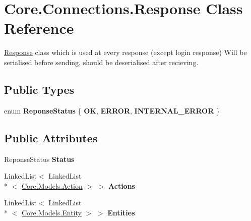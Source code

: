 \hypertarget{classCore_1_1Connections_1_1Response}{\section{Core.\-Connections.\-Response Class Reference}
\label{classCore_1_1Connections_1_1Response}
}


\hyperlink{classCore_1_1Connections_1_1Response}{Response} class which is used at every response (except login response) Will be serialised before sending, should be deserialised after recieving.  


\subsection*{Public Types}
\begin{DoxyCompactItemize}
\item 
enum {\bfseries Reponse\-Status} \{ {\bfseries O\-K}, 
{\bfseries E\-R\-R\-O\-R}, 
{\bfseries I\-N\-T\-E\-R\-N\-A\-L\-\_\-\-E\-R\-R\-O\-R}
 \}
\end{DoxyCompactItemize}
\subsection*{Public Attributes}
\begin{DoxyCompactItemize}
\item 
\hypertarget{classCore_1_1Connections_1_1Response_aa9f4fef77b99465a399e0af5111609ef}{Reponse\-Status {\bfseries Status}}\label{classCore_1_1Connections_1_1Response_aa9f4fef77b99465a399e0af5111609ef}

\item 
\hypertarget{classCore_1_1Connections_1_1Response_a4464e6ff81ca7d159485536b1f5edeec}{Linked\-List$<$ Linked\-List\\*
$<$ \hyperlink{classCore_1_1Models_1_1Action}{Core.\-Models.\-Action} $>$ $>$ {\bfseries Actions}}\label{classCore_1_1Connections_1_1Response_a4464e6ff81ca7d159485536b1f5edeec}

\item 
\hypertarget{classCore_1_1Connections_1_1Response_a3e678090e1fb696f0e3c7dfaca9b1275}{Linked\-List$<$ Linked\-List\\*
$<$ \hyperlink{classCore_1_1Models_1_1Entity}{Core.\-Models.\-Entity} $>$ $>$ {\bfseries Entities}}\label{classCore_1_1Connections_1_1Response_a3e678090e1fb696f0e3c7dfaca9b1275}

\end{DoxyCompactItemize}


